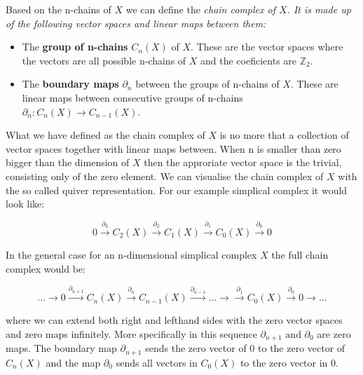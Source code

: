 Based on the n-chains of $X$ we can define the \em chain complex \em of $X$. It is made up of the following vector spaces and linear maps between them:

\begin{itemize}

    \item The \textbf{group of n-chains} $C_n(X)$ of $X$. These are the vector spaces where the vectors are all possible n-chains of $X$ and the coeficients are $\mathbb{Z}_2$.

    \item The \textbf{boundary maps} $\partial_n$ between the groups of n-chains of $X$. These are linear maps between consecutive groups of n-chains $\partial_n : C_n(X) \to C_{n-1}(X)$.

\end{itemize}

What we have defined as the chain complex of $X$ is no more that a collection of vector spaces together with linear maps between. When n is smaller than zero bigger than the dimension of $X$ then the approriate vector space is the trivial, consisting only of the zero element. We can visualise the chain complex of $X$ with the so called quiver representation. For our example simplical complex it would look like:

$$ 0 \overset{\partial_{3}}{\longrightarrow} C_2(X) \overset{\partial_{2}}{\longrightarrow} C_{1}(X) \overset{\partial_{1}}{\longrightarrow} C_{0}(X) \overset{\partial_0}{\longrightarrow}  0 $$

In the general case for an n-dimensional simplical complex $X$ the full chain complex would be:

$$ ... \longrightarrow 0 \overset{\partial_{n+1}}{\longrightarrow} C_n(X) \overset{\partial_{n}}{\longrightarrow} C_{n-1}(X) \overset{\partial_{n-1}}{\longrightarrow} ... \longrightarrow  \overset{\partial_1}{\longrightarrow} C_0(X) \overset{\partial_0}{\longrightarrow} 0 \longrightarrow ... $$

where we can extend both right and lefthand sides with the zero vector spaces and zero maps infinitely. More specifically in this sequence $\partial_{n+1} \text{ and } \partial_{0}$ are zero maps. The boundary map $\partial_{n+1}$ sends the zero vector of $0$ to the zero vector of $C_n(X)$ and the map $\partial_0$ sends all vectors in $C_0(X)$ to the zero vector in $0$.

